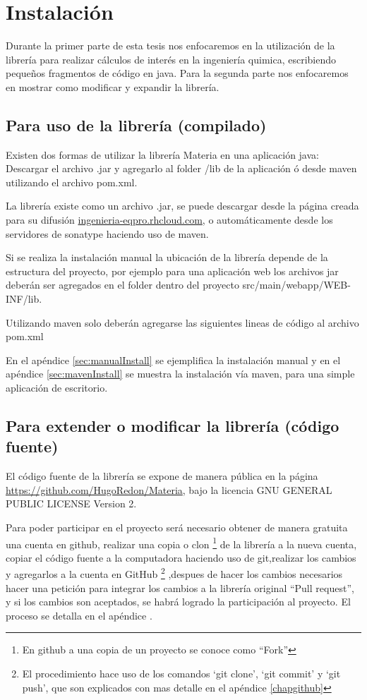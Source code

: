 \chapter{Instalación}

  Durante la primer parte de esta tesis nos enfocaremos en la utilización de la librería para realizar cálculos de interés en la ingeniería quimica, escribiendo pequeños fragmentos de código en java. Para la segunda parte nos enfocaremos en mostrar como modificar y expandir la librería.

  \section{Para uso de la librería (compilado)}

      Existen dos formas de utilizar la librería Materia en una aplicación java:
    Descargar el archivo .jar y agregarlo al folder /lib de la aplicación ó desde maven utilizando el archivo pom.xml.

    La librería existe como un archivo .jar, se puede descargar desde la página creada para su difusión \url{ingenieria-eqpro.rhcloud.com}, o automáticamente desde los servidores de sonatype haciendo uso de maven.

    Si se realiza la instalación manual la ubicación de la librería depende de la estructura del proyecto, por ejemplo para una aplicación web los archivos jar deberán ser agregados en el folder dentro del proyecto src/main/webapp/WEB-INF/lib.

    Utilizando maven solo deberán agregarse las siguientes lineas de código al archivo pom.xml

    

    En el apéndice \ref{sec:manualInstall} se ejemplifica la instalación manual y en el apéndice \ref{sec:mavenInstall} se muestra la instalación vía maven, para una simple aplicación de escritorio.


  \section{Para extender o modificar la librería (código fuente)}

    El código fuente de la librería se expone de manera pública en la página \url{https://github.com/HugoRedon/Materia}, bajo la licencia GNU GENERAL PUBLIC LICENSE Version 2.
  
    Para poder participar en el proyecto será necesario obtener de manera gratuita una cuenta en github, realizar una copia o clon \footnote{En github a una copia de un proyecto se conoce como ``Fork''} de la librería  a la nueva cuenta, copiar el código fuente a la computadora haciendo uso de git,realizar los cambios y agregarlos a la cuenta en GitHub  \footnote{El procedimiento hace uso de los comandos `git clone', `git commit' y `git push', que son explicados con mas detalle en el apéndice \ref{chapgithub}} ,despues de hacer los cambios necesarios hacer una petición para integrar los cambios a la librería original ``Pull request'', y si los cambios son aceptados, se habrá logrado la participación al proyecto. El proceso se detalla en el apéndice .



